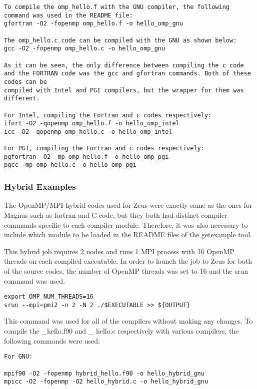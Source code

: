 \documentclass[journal]{IEEEtran}
\begin{document}
{\begin{verbatim}
To compile the omp_hello.f with the GNU compiler, the following command was used in the README file:
gfortran -O2 -fopenmp omp_hello.f -o hello_omp_gnu

The omp_hello.c code can be compiled with the GNU as shown below:
gcc -O2 -fopenmp omp_hello.c -o hello_omp_gnu

As it can be seen, the only difference between compiling the c code and the FORTRAN code was the gcc and gfortran commands. Both of these codes can be 
compiled with Intel and PGI compilers, but the wrapper for them was different.

For Intel, compiling the Fortran and c codes respectively:
ifort -O2 -qopenmp omp_hello.f -o hello_omp_intel
icc -O2 -qopenmp omp_hello.c -o hello_omp_intel

For PGI, compiling the Fortran and c codes respectively:
pgfortran -O2 -mp omp_hello.f -o hello_omp_pgi
pgcc -mp omp_hello.c -o hello_omp_pgi
\end{verbatim}


\subsubsection{Hybrid Examples}

The OpenMP/MPI hybrid codes used for Zeus were exactly same as the ones for Magnus such as fortran and C code, but they both had
distinct compiler commands specific to each compiler module. Therefore, it was also necessary to include which module to be loaded in the README files
of the getexample tool.

This hybrid job requires 2 nodes and runs 1 MPI process with 16 OpenMP threads on each compiled executable. In order to launch the job to Zeus for both 
of the source codes, the number of OpenMP threads was set to 16 and the srun command was used.

\begin{verbatim}
export OMP_NUM_THREADS=16
srun --mpi=pmi2 -n 2 -N 2 ./$EXECUTABLE >> ${OUTPUT}
\end{verbatim}

This command was used for all of the compilers without making any changes. To compile the \hybrid\_hello.f90 and \hybrid\_ hello.c respectively with various 
compilers, the following commands were used:

\begin{verbatim}
For GNU:

mpif90 -O2 -fopenmp hybrid_hello.f90 -o hello_hybrid_gnu
mpicc -O2 -fopenmp -O2 hello_hybrid.c -o hello_hybrid_gnu


\end{verbatim}}
\end{document}
